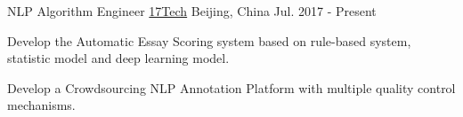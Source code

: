 

\begin{cventries}

  \cventry
    {NLP Algorithm Engineer} %
    {\href{https://www.17zuoye.com/help/aboutus.vpage}{17Tech}} %
    {Beijing, China} %
    {Jul. 2017 - Present} %
    {
      \begin{cvitems} %
        \item {Develop the Automatic Essay Scoring system based on rule-based system, statistic model and deep learning model.}
        \item {Develop a Crowdsourcing NLP Annotation Platform with multiple quality control mechanisms.}
      \end{cvitems}
    }



\end{cventries}